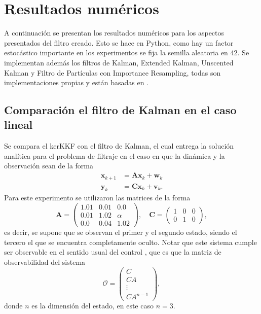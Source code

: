 \section{Resultados numéricos}

A continuación se presentan los resultados numéricos para los aspectos presentados del filtro creado. Esto se hace en Python, como hay un factor estocástico importante en los experimentos se fija la semilla aleatoria en 42. Se implementan además los filtros de Kalman, Extended Kalman, Unscented Kalman y Filtro de Partículas con Importance Resampling, todas son implementaciones propias y están basadas en \cite{Setoodeh2022NonlinearApplications}.

\subsection{Comparación el filtro de Kalman en el caso lineal}

Se compara el kerKKF con el filtro de Kalman, el cual entrega la solución analítica para el problema de filtraje en el caso en que la dinámica y la observación sean de la forma
\begin{equation*}
    \begin{aligned}
        \mathbf{x}_{k+1} &= \mathbf{A} \mathbf{x}_k + \mathbf{w}_k \\
        \mathbf{y}_k &= \mathbf{C} \mathbf{x}_k + \mathbf{v}_k.
    \end{aligned}
\end{equation*}
Para este experimento se utilizaron las matrices de la forma
\begin{equation*}
    \mathbf{A} =
    \begin{pmatrix}
        1.01 & 0.01 & 0.0 \\
        0.01 & 1.02 & \alpha \\
        0.0 & 0.04 & 1.02
    \end{pmatrix},
    \quad  \mathbf{C} = 
    \begin{pmatrix}
        1 & 0 & 0 \\
        0 & 1 & 0
    \end{pmatrix},
\end{equation*}
es decir, se supone que se observan el primer y el segundo estado, siendo el tercero el que se encuentra completamente oculto. Notar que este sistema cumple ser observable en el sentido usual del control \cite{Trelat2013ControleApplications}, que es que la matriz de observabilidad del sistema
\begin{equation*}
    \mathcal{O} = \begin{pmatrix}
        C \\
        CA \\
        \vdots \\
        CA^{n-1}
    \end{pmatrix},
\end{equation*}
donde $n$ es la dimensión del estado, en este caso $n=3$. 

